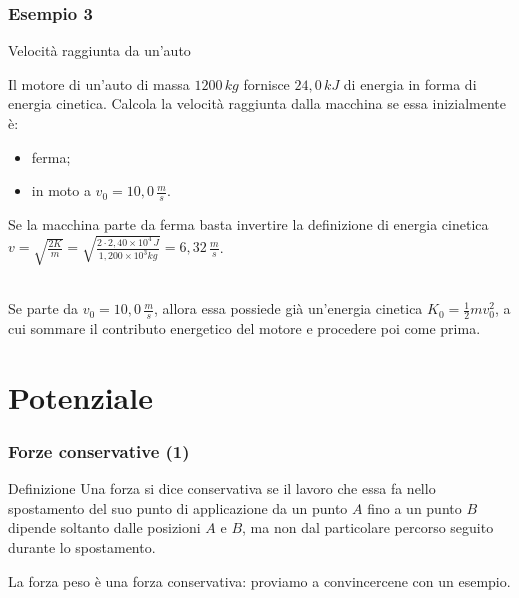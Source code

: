 \documentclass[]{beamer}
\theoremstyle{plain}
\begin{document}
\begin{frame}
  \frametitle{Esempio 3}
  \begin{exampleblock}{Velocità raggiunta da un'auto}
\begin{small}
Il motore di un'auto di massa $ 1200 \, kg $ fornisce $ 24,0 \, kJ $ di energia in forma di energia cinetica. Calcola la velocità raggiunta dalla macchina se essa inizialmente è:
\begin{itemize}
  \item ferma;
  \item in moto a $ v_0 = 10,0 \, \frac{m}{s} $.\pause
\end{itemize}
\end{small}
\end{exampleblock}
Se la macchina parte da ferma basta invertire la definizione di energia cinetica $ v = \sqrt{\frac{2K}{m}} = \sqrt{\frac{2 \cdot 2,40\times 10^4 \, J }{1,200 \times 10^3 kg}} = 6,32 \, \frac{m}{s}$.\\~\pause

Se parte da $ v_0 = 10,0 \, \frac{m}{s} $, allora essa \alert{possiede già un'energia cinetica} $ K_0 = \frac{1}{2}mv_0^2 $, a cui \alert{sommare il contributo energetico del motore} e procedere poi come prima.
\end{frame}

\section{Potenziale}

\begin{frame}
  \frametitle{Forze conservative (1)}
  \begin{block}{Definizione}
    Una forza si dice conservativa se il lavoro che essa fa nello spostamento del suo punto di applicazione da un punto $ A $ fino a un punto $ B $ dipende soltanto dalle posizioni $ A $ e $ B $, ma non dal particolare percorso seguito durante lo spostamento.
  \end{block}\pause
  \alert{La forza peso è una forza conservativa}: proviamo a convincercene con un esempio.
\end{frame}
\end{document}
